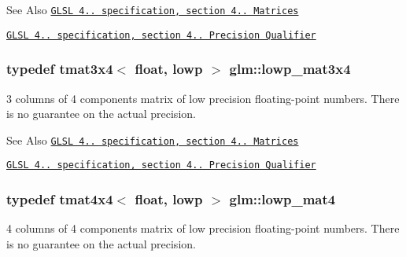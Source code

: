 \begin{DoxySeeAlso}{See Also}
\href{http://www.opengl.org/registry/doc/GLSLangSpec.4.20.8.pdf}{\tt G\-L\-S\-L 4.. specification, section 4.. Matrices} 

\href{http://www.opengl.org/registry/doc/GLSLangSpec.4.20.8.pdf}{\tt G\-L\-S\-L 4.. specification, section 4.. Precision Qualifier} 
\end{DoxySeeAlso}
\hypertarget{group__core__precision_ga06b2903b2f784e0e74e58f25e9b79b15}{
\subsubsection[{lowp\-\_\-mat3x4}]{\setlength{\rightskip}{0pt plus 5cm}typedef tmat3x4$<$ float, lowp $>$ {\bf glm\-::lowp\-\_\-mat3x4}}}\label{group__core__precision_ga06b2903b2f784e0e74e58f25e9b79b15}
3 columns of 4 components matrix of low precision floating-\/point numbers. There is no guarantee on the actual precision.

\begin{DoxySeeAlso}{See Also}
\href{http://www.opengl.org/registry/doc/GLSLangSpec.4.20.8.pdf}{\tt G\-L\-S\-L 4.. specification, section 4.. Matrices} 

\href{http://www.opengl.org/registry/doc/GLSLangSpec.4.20.8.pdf}{\tt G\-L\-S\-L 4.. specification, section 4.. Precision Qualifier} 
\end{DoxySeeAlso}
\hypertarget{group__core__precision_ga070380d2efa0c37d16f8677412518e02}{
\subsubsection[{lowp\-\_\-mat4}]{\setlength{\rightskip}{0pt plus 5cm}typedef tmat4x4$<$ float, lowp $>$ {\bf glm\-::lowp\-\_\-mat4}}}\label{group__core__precision_ga070380d2efa0c37d16f8677412518e02}
4 columns of 4 components matrix of low precision floating-\/point numbers. There is no guarantee on the actual precision.

